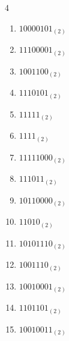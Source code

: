 \begin{multicols}{4}
\begin{enumerate}
        \phantom{$=27$}

  \item $10000101_{(2)}$

        \phantom{$=133$}

\columnbreak %

\resetques

  \item $11100001_{(2)}$

        \phantom{$=225$}

  \item $1001100_{(2)}$

        \phantom{$=76$}

  \item $1110101_{(2)}$

        \phantom{$=117$}

  \item $11111_{(2)}$

        \phantom{$=31$}

  \item $1111_{(2)}$

        \phantom{$=15$}

  \item $11111000_{(2)}$

        \phantom{$=248$}

  \item $111011_{(2)}$

        \phantom{$=59$}

  \item $10110000_{(2)}$

        \phantom{$=176$}

  \item $11010_{(2)}$

        \phantom{$=26$}

  \item $10101110_{(2)}$

        \phantom{$=174$}

  \item $1001110_{(2)}$

        \phantom{$=78$}

  \item $10010001_{(2)}$

        \phantom{$=145$}

  \item $1101101_{(2)}$

        \phantom{$=109$}

  \item $10010011_{(2)}$


\end{enumerate}
\end{multicols}
